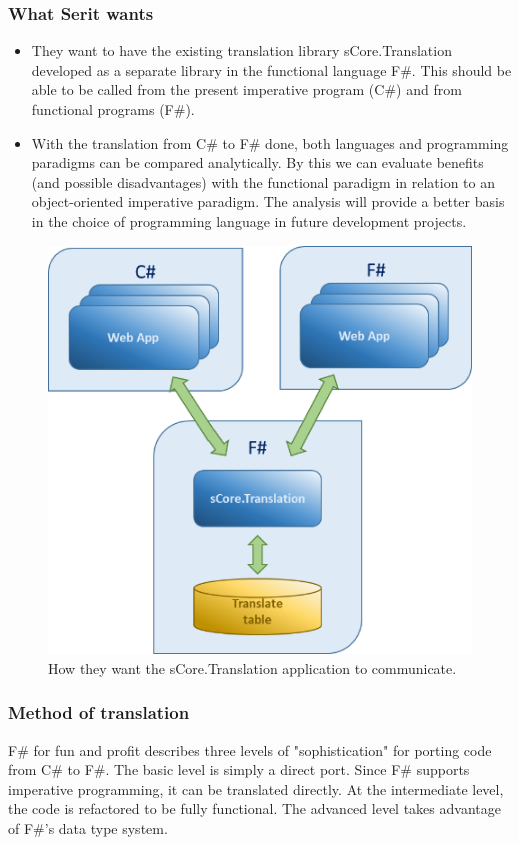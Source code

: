 \documentclass[12pt, a4paper]{article}
\begin{document}
\newpage
\subsubsection{What Serit wants}

\begin{itemize}
	\item They want to have the existing translation library sCore.Translation developed as a separate library in the functional language F\#. This should be able to be called from the present imperative program (C\#) and from functional programs (F\#).
	\item With the translation from C\# to F\# done, both languages and programming paradigms can be compared analytically. By this we can evaluate benefits (and possible disadvantages) with the functional paradigm in relation to an object-oriented imperative paradigm. The analysis will provide a better basis in the choice of programming language in future development projects.
\end{itemize}

\begin{figure}[!h]
    \includegraphics[scale=0.5]{image02}
    \centering
    \caption{How they want the sCore.Translation application to communicate.}
\end{figure}

\newpage
\subsubsection{Method of translation}
F\# for fun and profit describes three levels of "sophistication" for porting code from C\# to F\#. The basic level is simply a direct port. Since F\# supports imperative programming, it can be translated directly. At the intermediate level, the code is refactored to be fully functional. The advanced level takes advantage of F\#’s data type system.\\
\end{document}
